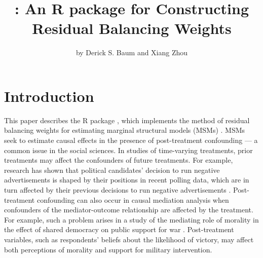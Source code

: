 \title{: An R package for Constructing Residual Balancing
Weights}
\author{by Derick S. Baum and Xiang Zhou}

\maketitle


\hypertarget{intro}{%
\section{Introduction}\label{intro}}

This paper describes the R package , which implements the
method of residual balancing weights for estimating marginal structural
models (MSMs) \citep{zhouResidualBalancingMethod2020a}. MSMs seek to
estimate causal effects in the presence of post-treatment confounding
--- a common issue in the social sciences. In studies of time-varying
treatments, prior treatments may affect the confounders of future
treatments. For example, research has shown that political candidates'
decision to run negative advertisements is shaped by their positions in
recent polling data, which are in turn affected by their previous
decisions to run negative advertisements
\citep{lauEffectsNegativePolitical2007, blackwellFrameworkDynamicCausal2013}.
Post-treatment confounding can also occur in causal mediation analysis
when confounders of the mediator-outcome relationship are affected by
the treatment. For example, such a problem arises in a study of the
mediating role of morality in the effect of shared democracy on public
support for war \citep{tomzPublicOpinionDemocratic2013a}. Post-treatment
variables, such as respondents' beliefs about the likelihood of victory,
may affect both perceptions of morality and support for military
intervention.

